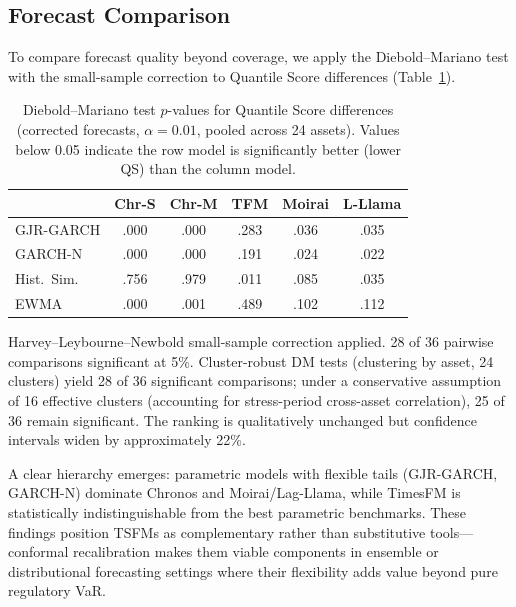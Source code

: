 \documentclass[preprint,11pt,authoryear]{elsarticle}
\newcommand{\1}{\boldsymbol{1}}
\begin{document}
	
	\subsection{Forecast Comparison}
	\label{sec:forecast_eval}
	
	
	To compare forecast quality beyond coverage, we apply the
	Diebold--Mariano test \citep{diebold1995comparing} with the
	\citet{harvey1997testing} small-sample correction to Quantile
	Score differences (Table~\ref{tab:dm}).
	
	\begin{table}[H]
		\centering
		\caption{Diebold--Mariano test $p$-values for Quantile Score differences (corrected forecasts, $\alpha=0.01$, pooled across 24 assets). Values below 0.05 indicate the row model is significantly better (lower QS) than the column model.}
		\label{tab:dm}
		\footnotesize
		\begin{tabular}{@{}lccccc@{}}
			\toprule
			& Chr-S & Chr-M & TFM & Moirai & L-Llama \\
			\midrule
			GJR-GARCH   & .000 & .000 & .283 & .036 & .035 \\
			GARCH-N     & .000 & .000 & .191 & .024 & .022 \\
			Hist.\ Sim. & .756 & .979 & .011 & .085 & .035 \\
			EWMA        & .000 & .001 & .489 & .102 & .112 \\
			\bottomrule
		\end{tabular}
		\begin{minipage}{\linewidth}\footnotesize
			\smallskip
			Harvey--Leybourne--Newbold small-sample correction applied.
			28 of 36 pairwise comparisons significant at 5\%.
			Cluster-robust DM tests (clustering by asset, 24 clusters)
			yield 28 of 36 significant comparisons; under a conservative
			assumption of 16 effective clusters (accounting for
			stress-period cross-asset correlation), 25 of 36 remain
			significant. The ranking is qualitatively unchanged but
			confidence intervals widen by approximately 22\%.
		\end{minipage}
	\end{table}
	
	A clear hierarchy emerges: parametric models with flexible
	tails (GJR-GARCH, GARCH-N) dominate Chronos and
	Moirai/Lag-Llama, while TimesFM is statistically
	indistinguishable from the best parametric benchmarks. These
	findings position TSFMs as complementary rather than
	substitutive tools---conformal recalibration makes them viable
	components in ensemble or distributional forecasting settings
	where their flexibility adds value beyond pure regulatory VaR.
	
\end{document}
